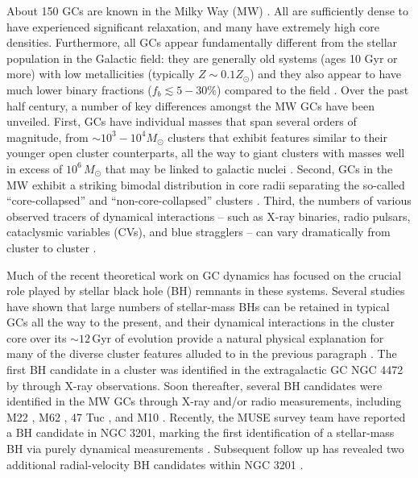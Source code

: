 \documentclass[twocolumn,tighten]{aastex63}
\begin{document}
About 150 GCs are known in the Milky Way (MW) \citep[e.g.,][]{Harris1996,Baumgardt2018}. 
All are sufficiently dense to have experienced significant relaxation, and many have extremely high core densities. Furthermore, all GCs appear fundamentally different from the stellar population in the Galactic field: they are generally old systems (ages  10 Gyr or more) with low metallicities (typically $Z\sim0.1Z_{\odot}$) and they also appear to have much lower binary fractions ($f_b \lesssim 5-30\%$) compared to the field \citep[$f_b \gtrsim 50\%$; e.g.,][]{Sana2012, Kroupa2018}. Over the past half century, a number of key differences amongst the MW GCs have been unveiled.
First, GCs have individual masses that span several orders of magnitude, from $\sim10^3 - 10^4M_{\odot}$ clusters that exhibit features similar to their younger open cluster counterparts, all the way to giant clusters with masses well in excess of $10^6\,M_{\odot}$ that may be linked to galactic nuclei \citep{Harris1996,Baumgardt2018}. Second, GCs in the MW exhibit a striking bimodal distribution in core radii separating the so-called ``core-collapsed'' and ``non-core-collapsed'' clusters \citep[e.g.,][]{Harris1996,McLaughlin2005}. Third, the numbers of various observed tracers of dynamical interactions -- such as X-ray binaries, radio pulsars, cataclysmic variables (CVs), and blue stragglers -- can vary dramatically from cluster to cluster \citep[e.g.,][]{Ransom2008,Heinke2010,Knigge2012, Ferraro2012}.

Much of the recent theoretical work on GC dynamics has focused on the crucial role played by stellar black hole (BH) remnants in these systems.
Several studies have shown that large numbers of stellar-mass BHs can be retained in typical GCs all the way to the present, and their dynamical interactions in the cluster core over its $\sim 12\,$Gyr of evolution provide a natural physical explanation for many of the diverse cluster features alluded to in the previous paragraph \citep[e.g.,][]{Morscher2015,Mackey2008,BreenHeggie2013,Askar2018,Kremer2019a}. The first BH candidate in a cluster was identified in the extragalactic GC NGC 4472 by \citet{Maccarone2007} through X-ray observations.
Soon thereafter, several BH candidates were identified in the MW GCs through X-ray and/or radio measurements, including M22 \citep{Strader2012}, M62 \citep{Chomiuk2013}, 47 Tuc \citep{Miller-Jones2015}, and M10 \citep{Shishkovsky2018}. Recently, the MUSE survey team have reported a BH candidate in NGC 3201, marking the first identification of a stellar-mass BH via purely dynamical measurements \citep{Giesers2018}.
Subsequent follow up has revealed two additional radial-velocity BH candidates within NGC 3201 \citep{Giesers2019}.
\end{document}
